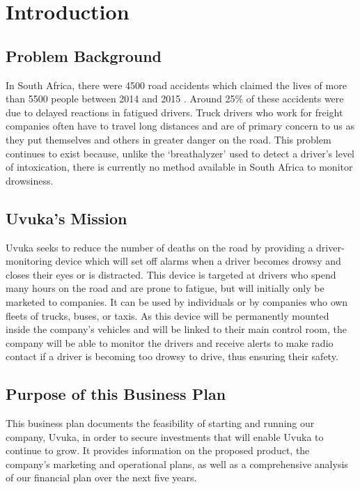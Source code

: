 \chapter{Introduction}
\section{Problem Background}
In South Africa, there were 4500 road accidents which claimed the lives of more than 5500 people between 2014 and 2015 \cite{EWNRoadDeaths}. Around 25\% of these accidents were due to delayed reactions in fatigued drivers. Truck drivers who work for freight companies often have to travel long distances and are of primary concern to us as they put themselves and others in greater danger on the road. This problem continues to exist because, unlike the `breathalyzer' used to detect a driver's level of intoxication, there is currently no method available in South Africa to monitor drowsiness.

\section{Uvuka's Mission}
Uvuka seeks to reduce the number of deaths on the road by providing a driver-monitoring device which will set off alarms when a driver becomes drowsy and closes their eyes or is distracted. This device is targeted at drivers who spend many hours on the road and are prone to fatigue, but will initially only be marketed to companies. It can be used by individuals or by companies who own fleets of trucks, buses, or taxis. As this device will be permanently mounted inside the company's vehicles and will be linked to their main control room, the company will be able to monitor the drivers and receive alerts to make radio contact if a driver is becoming too drowsy to drive, thus ensuring their safety.

\section{Purpose of this Business Plan}
This business plan documents the feasibility of starting and running our company, Uvuka, in order to secure investments that will enable Uvuka to continue to grow. It provides information on the proposed product, the company's marketing and operational plans, as well as a comprehensive analysis of our financial plan over the next five years. 

